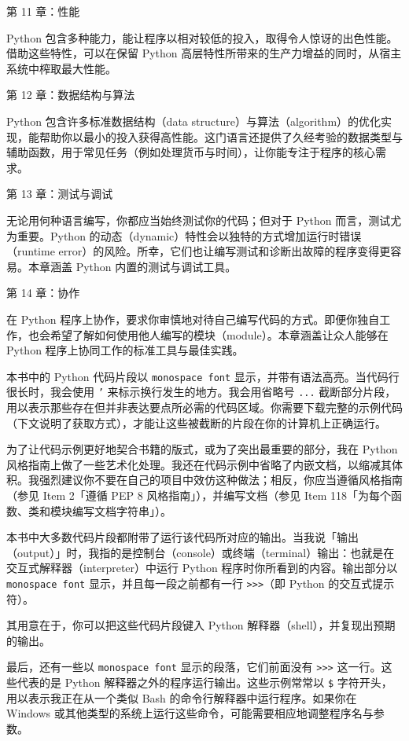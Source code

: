 第 11 章：性能

Python 包含多种能力，能让程序以相对较低的投入，取得令人惊讶的出色性能。借助这些特性，可以在保留 Python 高层特性所带来的生产力增益的同时，从宿主系统中榨取最大性能。

第 12 章：数据结构与算法

Python 包含许多标准数据结构（data structure）与算法（algorithm）的优化实现，能帮助你以最小的投入获得高性能。这门语言还提供了久经考验的数据类型与辅助函数，用于常见任务（例如处理货币与时间），让你能专注于程序的核心需求。

第 13 章：测试与调试

无论用何种语言编写，你都应当始终测试你的代码；但对于 Python 而言，测试尤为重要。Python 的动态（dynamic）特性会以独特的方式增加运行时错误（runtime error）的风险。所幸，它们也让编写测试和诊断出故障的程序变得更容易。本章涵盖 Python 内置的测试与调试工具。

第 14 章：协作

在 Python 程序上协作，要求你审慎地对待自己编写代码的方式。即便你独自工作，也会希望了解如何使用他人编写的模块（module）。本章涵盖让众人能够在 Python 程序上协同工作的标准工具与最佳实践。

本书中的 Python 代码片段以 \texttt{monospace font} 显示，并带有语法高亮。当代码行很长时，我会使用 \texttt{'} 来标示换行发生的地方。我会用省略号 \texttt{...} 截断部分片段，用以表示那些存在但并非表达要点所必需的代码区域。你需要下载完整的示例代码（下文说明了获取方式），才能让这些被截断的片段在你的计算机上正确运行。

为了让代码示例更好地契合书籍的版式，或为了突出最重要的部分，我在 Python 风格指南上做了一些艺术化处理。我还在代码示例中省略了内嵌文档，以缩减其体积。我强烈建议你不要在自己的项目中效仿这种做法；相反，你应当遵循风格指南（参见 Item 2「遵循 PEP 8 风格指南」），并编写文档（参见 Item 118「为每个函数、类和模块编写文档字符串」）。

本书中大多数代码片段都附带了运行该代码所对应的输出。当我说「输出（output）」时，我指的是控制台（console）或终端（terminal）输出：也就是在交互式解释器（interpreter）中运行 Python 程序时你所看到的内容。输出部分以 \texttt{monospace font} 显示，并且每一段之前都有一行 \texttt{>>>}（即 Python 的交互式提示符）。

其用意在于，你可以把这些代码片段键入 Python 解释器（shell），并复现出预期的输出。

最后，还有一些以 \texttt{monospace font} 显示的段落，它们前面没有 \texttt{>>>} 这一行。这些代表的是 Python 解释器之外的程序运行输出。这些示例常常以 \texttt{\$} 字符开头，用以表示我正在从一个类似 Bash 的命令行解释器中运行程序。如果你在 Windows 或其他类型的系统上运行这些命令，可能需要相应地调整程序名与参数。

